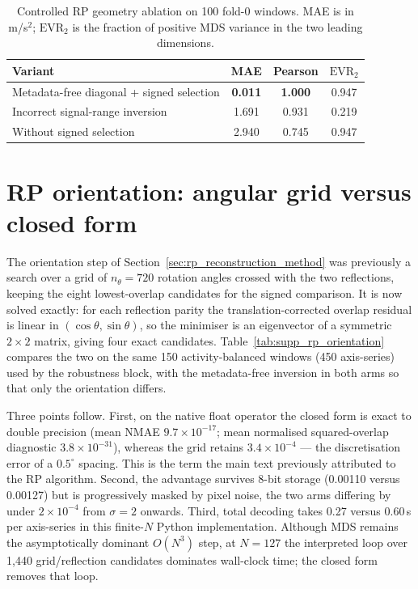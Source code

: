 \documentclass[10pt,a4paper,parskip=half-]{scrartcl}
\begin{document}
\begin{table}[H]
\centering
\caption{Controlled RP geometry ablation on 100 fold-0 windows. MAE is in m/s$^2$; $\mathrm{EVR}_2$ is the fraction of positive MDS variance in the two leading dimensions.}
\label{tab:supp_rp_ablation}
\begin{tabular}{lccc}
\toprule
Variant & MAE & Pearson & $\mathrm{EVR}_2$ \\
\midrule
Metadata-free diagonal + signed selection & \textbf{0.011} & \textbf{1.000} & 0.947 \\
Incorrect signal-range inversion & 1.691 & 0.931 & 0.219 \\
Without signed selection & 2.940 & 0.745 & 0.947 \\
\bottomrule
\end{tabular}
\end{table}


\section{RP orientation: angular grid versus closed form}
\label{sec:supp_rp_orientation}

The orientation step of Section~\ref{sec:rp_reconstruction_method} was previously a search over a grid of $n_\theta=720$ rotation angles crossed with the two reflections, keeping the eight lowest-overlap candidates for the signed comparison. It is now solved exactly: for each reflection parity the translation-corrected overlap residual is linear in $(\cos\theta,\sin\theta)$, so the minimiser is an eigenvector of a symmetric $2\times2$ matrix, giving four exact candidates. Table~\ref{tab:supp_rp_orientation} compares the two on the same 150 activity-balanced windows (450 axis-series) used by the robustness block, with the metadata-free inversion in both arms so that only the orientation differs.

Three points follow. First, on the native float operator the closed form is exact to double precision (mean NMAE $9.7\times10^{-17}$; mean normalised squared-overlap diagnostic $3.8\times10^{-31}$), whereas the grid retains $3.4\times10^{-4}$ --- the discretisation error of a $0.5^\circ$ spacing. This is the term the main text previously attributed to the RP algorithm. Second, the advantage survives 8-bit storage (0.00110 versus 0.00127) but is progressively masked by pixel noise, the two arms differing by under $2\times10^{-4}$ from $\sigma=2$ onwards. Third, total decoding takes 0.27 versus 0.60\,s per axis-series in this finite-$N$ Python implementation. Although MDS remains the asymptotically dominant $O(N^3)$ step, at $N=127$ the interpreted loop over 1,440 grid/reflection candidates dominates wall-clock time; the closed form removes that loop.
\end{document}
